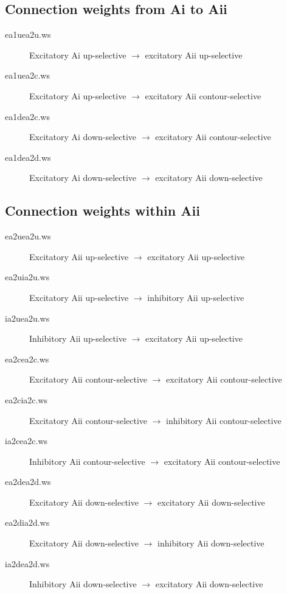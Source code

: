 \documentclass[12pt]{article}
\begin{document}
\subsection{Connection weights from Ai to Aii}
\begin{description}
  \item[ea1uea2u.ws] Excitatory Ai up-selective $\rightarrow$
                     excitatory Aii up-selective
  \item[ea1uea2c.ws] Excitatory Ai up-selective $\rightarrow$ 
                     excitatory Aii contour-selective
  \item[ea1dea2c.ws] Excitatory Ai down-selective $\rightarrow$ 
                     excitatory Aii contour-selective
  \item[ea1dea2d.ws] Excitatory Ai down-selective $\rightarrow$ 
                     excitatory Aii down-selective
\end{description}

\subsection{Connection weights within Aii}
\begin{description}
  \item[ea2uea2u.ws] Excitatory Aii up-selective $\rightarrow$
                     excitatory Aii up-selective
  \item[ea2uia2u.ws] Excitatory Aii up-selective $\rightarrow$
                     inhibitory Aii up-selective
  \item[ia2uea2u.ws] Inhibitory Aii up-selective $\rightarrow$
                     excitatory Aii up-selective
  \item[ea2cea2c.ws] Excitatory Aii contour-selective $\rightarrow$
                     excitatory Aii contour-selective
  \item[ea2cia2c.ws] Excitatory Aii contour-selective $\rightarrow$
                     inhibitory Aii contour-selective
  \item[ia2cea2c.ws] Inhibitory Aii contour-selective $\rightarrow$
                     excitatory Aii contour-selective
  \item[ea2dea2d.ws] Excitatory Aii down-selective $\rightarrow$
                     excitatory Aii down-selective
  \item[ea2dia2d.ws] Excitatory Aii down-selective $\rightarrow$
                     inhibitory Aii down-selective
  \item[ia2dea2d.ws] Inhibitory Aii down-selective $\rightarrow$
                     excitatory Aii down-selective
\end{description}
\end{document}
